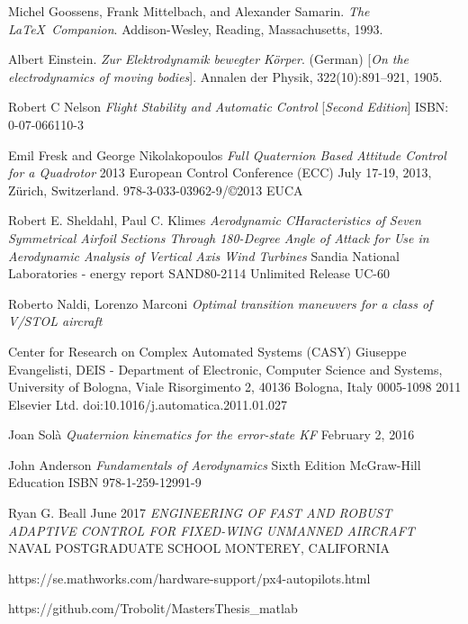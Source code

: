 \documentclass{article}
\begin{document}

\newpage

\begin{thebibliography}{9}
Michel Goossens, Frank Mittelbach, and Alexander Samarin. 
\textit{The \LaTeX\ Companion}. 
Addison-Wesley, Reading, Massachusetts, 1993.

Albert Einstein. 
\textit{Zur Elektrodynamik bewegter K{\"o}rper}. (German) 
[\textit{On the electrodynamics of moving bodies}]. 
Annalen der Physik, 322(10):891–921, 1905.

Robert C Nelson
\textit{Flight Stability and Automatic Control}
[\textit{Second Edition}]
ISBN: 0-07-066110-3

Emil Fresk and George Nikolakopoulos
\textit{Full Quaternion Based Attitude Control for a Quadrotor}
2013 European Control Conference (ECC)
July 17-19, 2013, Zürich, Switzerland.
978-3-033-03962-9/©2013 EUCA

Robert E. Sheldahl, Paul C. Klimes
\textit{Aerodynamic CHaracteristics of Seven Symmetrical Airfoil Sections Through 180-Degree Angle of Attack for Use in Aerodynamic Analysis of Vertical Axis Wind Turbines}
Sandia National Laboratories - energy report
SAND80-2114 Unlimited Release UC-60

Roberto Naldi, Lorenzo Marconi
\textit{Optimal transition maneuvers for a class of V/STOL aircraft}

Center for Research on Complex Automated Systems (CASY) Giuseppe Evangelisti, DEIS - Department of Electronic, Computer Science and Systems, University of Bologna, Viale
Risorgimento 2, 40136 Bologna, Italy
0005-1098 
2011 Elsevier Ltd.
doi:10.1016/j.automatica.2011.01.027

Joan Sol\`{a}
\textit{Quaternion kinematics for the error-state KF}
February 2, 2016

John Anderson
\textit{Fundamentals of Aerodynamics}
Sixth Edition
McGraw-Hill Education
ISBN 978-1-259-12991-9

Ryan G. Beall
June 2017
\textit{ENGINEERING OF FAST AND ROBUST ADAPTIVE
CONTROL FOR FIXED-WING UNMANNED AIRCRAFT}
NAVAL POSTGRADUATE SCHOOL MONTEREY, CALIFORNIA

https://se.mathworks.com/hardware-support/px4-autopilots.html

https://github.com/Trobolit/MastersThesis\_matlab

\end{thebibliography}
\end{document}
